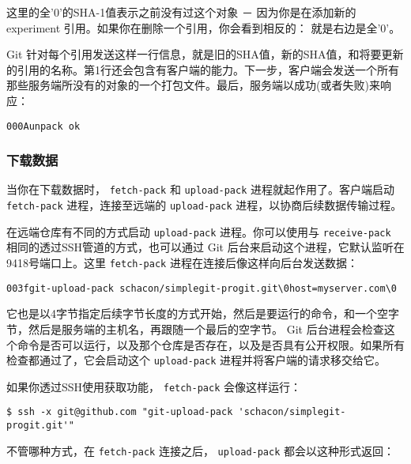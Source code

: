 \documentclass[a4paper]{book}
\begin{document}
这里的全'0'的SHA-1值表示之前没有过这个对象 － 因为你是在添加新的 experiment 引用。如果你在删除一个引用，你会看到相反的： 就是右边是全'0'。

Git 针对每个引用发送这样一行信息，就是旧的SHA值，新的SHA值，和将要更新的引用的名称。第1行还会包含有客户端的能力。下一步，客户端会发送一个所有那些服务端所没有的对象的一个打包文件。最后，服务端以成功(或者失败)来响应：

\begin{shaded}\begin{verbatim}
000Aunpack ok
\end{verbatim}\end{shaded}

\subsubsection{下载数据}

当你在下载数据时， \texttt{fetch-pack} 和 \texttt{upload-pack} 进程就起作用了。客户端启动 \texttt{fetch-pack} 进程，连接至远端的 \texttt{upload-pack} 进程，以协商后续数据传输过程。

在远端仓库有不同的方式启动 \texttt{upload-pack} 进程。你可以使用与 \texttt{receive-pack} 相同的透过SSH管道的方式，也可以通过 Git 后台来启动这个进程，它默认监听在9418号端口上。这里 \texttt{fetch-pack} 进程在连接后像这样向后台发送数据：

\begin{shaded}\begin{verbatim}
003fgit-upload-pack schacon/simplegit-progit.git\0host=myserver.com\0
\end{verbatim}\end{shaded}

它也是以4字节指定后续字节长度的方式开始，然后是要运行的命令，和一个空字节，然后是服务端的主机名，再跟随一个最后的空字节。 Git 后台进程会检查这个命令是否可以运行，以及那个仓库是否存在，以及是否具有公开权限。如果所有检查都通过了，它会启动这个 \texttt{upload-pack} 进程并将客户端的请求移交给它。

如果你透过SSH使用获取功能， \texttt{fetch-pack} 会像这样运行：

\begin{shaded}\begin{verbatim}
$ ssh -x git@github.com "git-upload-pack 'schacon/simplegit-progit.git'"
\end{verbatim}\end{shaded}

不管哪种方式，在 \texttt{fetch-pack} 连接之后， \texttt{upload-pack} 都会以这种形式返回：
\end{document}
